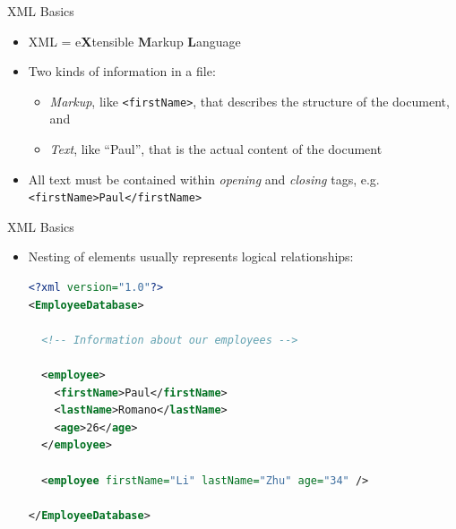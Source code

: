 \documentclass[serif]{beamer}
\begin{document}

\begin{frame}{XML Basics}
  \begin{itemize}
  \item<1-> XML = e\textbf{X}tensible \textbf{M}arkup \textbf{L}anguage
  \item<1-> Two kinds of information in a file:
    \begin{itemize}
    \item<1-> \textit{Markup}, like \texttt{<firstName>}, that describes the
      structure of the document, and
    \item<1-> \textit{Text}, like ``Paul'', that is the actual content of the document
    \end{itemize}
  \item<1-> All text must be contained within \textit{opening} and
    \textit{closing} tags, e.g. \texttt{<firstName>Paul</firstName>}
  \end{itemize}
\end{frame}


\begin{frame}[fragile]{XML Basics}
  \begin{itemize}
  \item<1-> Nesting of elements usually represents logical relationships:
    \begin{lstlisting}[language=XML]
<?xml version="1.0"?>
<EmployeeDatabase>

  <!-- Information about our employees -->

  <employee>
    <firstName>Paul</firstName>
    <lastName>Romano</lastName>
    <age>26</age>
  </employee>

  <employee firstName="Li" lastName="Zhu" age="34" />

</EmployeeDatabase>
    \end{lstlisting}
  \end{itemize}
\end{frame}

\end{document}
